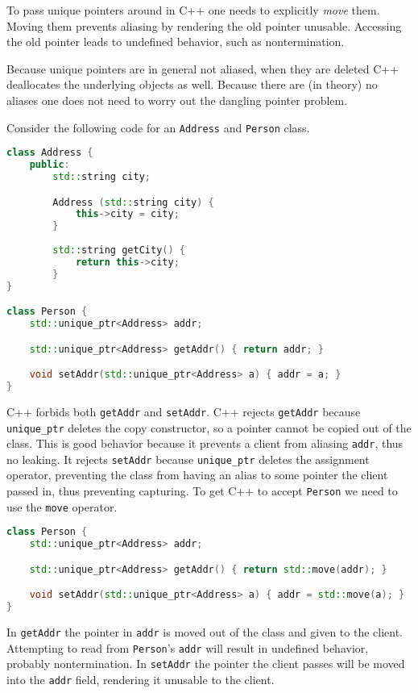 \documentclass{article}
\begin{document}
To pass unique pointers around in C++ one needs to explicitly \textit{move} them.
Moving them prevents aliasing by rendering the old pointer unusable.
Accessing the old pointer leads to undefined behavior, such as nontermination.

Because unique pointers are in general not aliased, when they are deleted C++ deallocates the underlying objects as well.
Because there are (in theory) no aliases one does not need to worry out the dangling pointer problem.

\begin{example}
  Consider the following code for an \texttt{Address} and \texttt{Person} class.
\begin{lstlisting}[language=C++]
class Address {
    public:
        std::string city;

        Address (std::string city) {
            this->city = city;
        }
    
        std::string getCity() {
            return this->city;
        }
}

class Person {
    std::unique_ptr<Address> addr;

    std::unique_ptr<Address> getAddr() { return addr; }

    void setAddr(std::unique_ptr<Address> a) { addr = a; } 
}
\end{lstlisting}

  C++ forbids both \texttt{getAddr} and \texttt{setAddr}.
  C++ rejects \texttt{getAddr} because \texttt{unique\_ptr} deletes the copy constructor, so a pointer cannot be copied out of the class.
  This is good behavior because it prevents a client from aliasing \texttt{addr}, thus no leaking.
  It rejects \texttt{setAddr} because \texttt{unique\_ptr} deletes the assignment operator, preventing the class from having an alias to some pointer the client passed in, thus preventing capturing.
  To get C++ to accept \texttt{Person} we need to use the \texttt{move} operator.

\begin{lstlisting}[language=C++]
class Person {
    std::unique_ptr<Address> addr;

    std::unique_ptr<Address> getAddr() { return std::move(addr); }

    void setAddr(std::unique_ptr<Address> a) { addr = std::move(a); } 
}
\end{lstlisting}
  In \texttt{getAddr} the pointer in \texttt{addr} is moved out of the class and given to the client.
  Attempting to read from \texttt{Person}'s \texttt{addr} will result in undefined behavior, probably nontermination.
  In \texttt{setAddr} the pointer the client passes will be moved into the \texttt{addr} field, rendering it unusable to the client.
\end{example}
\end{document}

